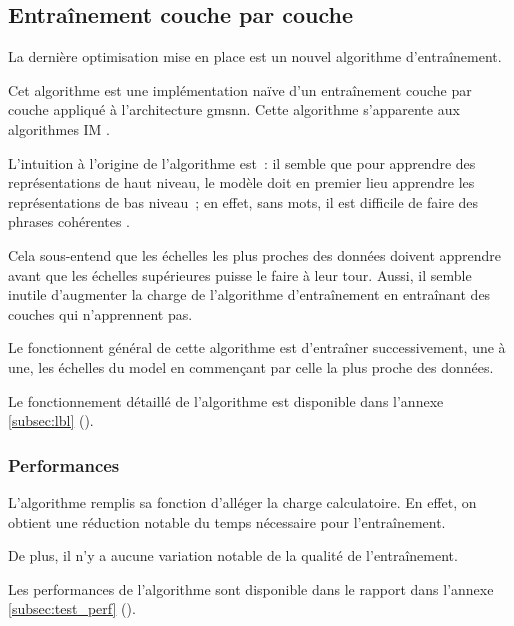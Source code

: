 \subsection{Entraînement couche par couche}\label{subsec:optilbl}
La dernière optimisation mise en place est un nouvel algorithme d'entraînement.

Cet algorithme est une implémentation naïve d'un entraînement couche par couche appliqué à l'architecture \gls{gmsnn}. Cette algorithme s'apparente aux algorithmes IM . %

L'intuition à l'origine de l'algorithme est~:
\og il semble que pour apprendre des représentations de haut niveau, le modèle doit en premier lieu apprendre les représentations de bas niveau~;
en effet, sans mots, il est difficile de faire des phrases cohérentes \fg{}.

Cela sous-entend que les échelles les plus proches des données doivent apprendre avant que les échelles supérieures puisse le faire à leur tour.
Aussi, il semble inutile d'augmenter la charge de l'algorithme d'entraînement en entraînant des couches qui n'apprennent pas.

Le fonctionnent général de cette algorithme est d'entraîner successivement, une à une, les échelles du \gls{model} en commençant par celle la plus proche des données.

Le fonctionnement détaillé de l'algorithme est disponible dans l'annexe \ref{subsec:lbl} ().

\subsubsection{Performances}

L'algorithme remplis sa fonction d'alléger la charge calculatoire. En effet, on obtient une réduction notable du temps nécessaire pour l'entraînement.

De plus, il n'y a aucune variation notable de la qualité de l'entraînement.

Les performances de l'algorithme sont disponible dans le rapport dans l'annexe \ref{subsec:test_perf} ().


